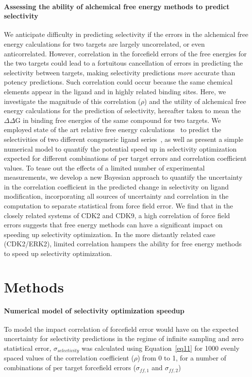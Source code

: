 \documentclass[9pt,lineno]{elife-modified} %
\begin{document}
\paragraph{Assessing the ability of alchemical free energy methods to predict selectivity}
We anticipate difficulty in predicting selectivity if the errors in the alchemical free energy calculations for two targets are largely uncorrelated, or even anticorrelated. However, correlation in the forcefield errors of the free energies for the two targets could lead to a fortuitous cancellation of errors in predicting the selectivity between targets, making selectivity predictions \emph{more} accurate than potency predictions. Such correlation could occur because the same chemical elements appear in the ligand and in highly related binding sites. 
Here, we investigate the magnitude of this correlation ($\rho$) and the utility of alchemical free energy calculations for the prediction of selectivity, hereafter taken to mean the $\Delta \Delta$G in binding free energies of the same compound for two targets. We employed state of the art relative free energy calculations~\citep{Wang:J.Am.Chem.Soc.:2015,Abel:2017jt} to predict the selectivities of two different congeneric ligand series~\citep{Shao2013-oe, Blake2016-su}, as well as present a simple numerical model to quantify the potential speed up in selectivity optimization expected for different combinations of per target errors and correlation coefficient values. To tease out the effects of a limited number of experimental measurements, we develop a new Bayesian approach to quantify the uncertainty in the correlation coefficient in the predicted change in selectivity on ligand modification, incorporating all sources of uncertainty and correlation in the computation to separate statistical from force field error. We find that in the closely related systems of CDK2 and CDK9, a high correlation of force field errors suggests that free energy methods can have a significant impact on speeding up selectivity optimization. In the more distantly related case (CDK2/ERK2), limited correlation hampers the ability for free energy methods to speed up selectivity optimization. 

   
%
%
%
%
\section{Methods}

\paragraph{Numerical model of selectivity optimization speedup}
To model the impact correlation of forcefield error would have on the expected uncertainty for selectivity predictions in the regime of infinite sampling and zero statistical error, $\sigma_{selectivity}$ was calculated using Equation~\ref{eq11} for 1000 evenly spaced values of the correlation coefficient ($\rho$) from 0 to 1, for a number of combinations of per target forcefield errors ($\sigma_{ff,1}$ and $\sigma_{ff,2}$) 
\end{document}
